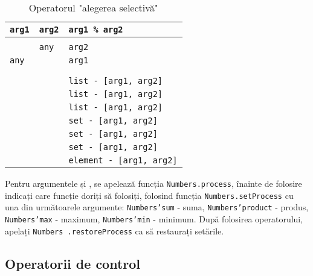 \begin{table}[htb]
	\caption{Operatorul "alegerea selectivă"}
	\label{centhacktable}
	\begin{tabular}{|l|l|l|}
		\hline
		\texttt{arg1} & \texttt{arg2} & \texttt{arg1 \% arg2}			\\ \hline
		\void{}     & \void{}     & \void{}						\\ \hline
		\void{}     & \texttt{any}  & \texttt{arg2}					\\ \hline
		\texttt{any}  & \void{}     & \texttt{arg1}					\\ \hline
		\integer{}  & \integer{}  & \integer{}					\\ \hline
		\double{}   & \double{}   & \double{}					\\ \hline
		\str{}      & \str{}      & \texttt{list - [arg1, arg2]}	\\ \hline
		\listtype{} & \str{}      & \texttt{list - [arg1, arg2]}	\\ \hline
		\listtype{} & \listtype{} & \texttt{list - [arg1, arg2]}	\\ \hline
		\object{}   & \object{}   & \texttt{set - [arg1, arg2]}	\\ \hline
		\set{}      & \object{}   & \texttt{set - [arg1, arg2]}	\\ \hline
		\set{}      & \set{}      & \texttt{set - [arg1, arg2]}	\\ \hline
		\element{}  & \element{}  & \texttt{element - [arg1, arg2]}\\ \hline
	\end{tabular}
	\vspace{0em}
\end{table}

Pentru argumentele \integer{} și \double{}, se apelează funcția \texttt{Numbers.process}, înainte de folosire indicați care funcție doriți să folosiți, folosind funcția \texttt{Numbers.setProcess} cu una din următoarele argumente: \texttt{Numbers'sum} - suma, \texttt{Numbers'product} - produs, \texttt{Numbers'max} - maximum, \texttt{Numbers'min} - minimum. După folosirea operatorului, apelați \texttt{Numbers .restoreProcess} ca să restaurați setările.

\subsection{Operatorii de control}

